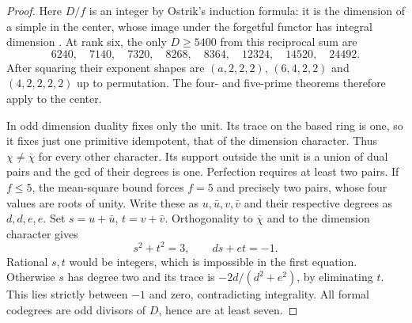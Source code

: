 \documentclass[11pt,a4paper]{article}
\numberwithin{equation}{section}
\theoremstyle{remark}
\begin{document}
\begin{proof}
Here $D/f$ is an integer by Ostrik's induction formula: it is the dimension of a simple in the center, whose image under the forgetful functor has integral dimension \cite[Theorem~2.13]{OstrikPivotalRankThree}. At rank six, the only $D\ge5400$ from this reciprocal sum are
\[
6240,\quad7140,\quad7320,\quad8268,\quad8364,\quad12324,\quad14520,\quad24492 .
\]
After squaring their exponent shapes are $(a,2,2,2)$, $(6,4,2,2)$
and $(4,2,2,2,2)$ up to permutation. The four- and five-prime theorems
therefore apply to the center.

In odd dimension duality fixes only the unit. Its trace on the based
ring is one, so it fixes just one primitive idempotent, that of the
dimension character. Thus $\chi\ne\overline\chi$ for every other
character. Its support outside the unit is a union of dual pairs and
the gcd of their degrees is one. Perfection requires at least two pairs.
If $f\le5$, the mean-square bound forces $f=5$ and precisely two pairs,
whose four values are roots of unity. Write these as $u,\bar u,v,\bar v$
and their respective degrees as $d,d,e,e$. Set $s=u+\bar u$,
$t=v+\bar v$. Orthogonality to $\overline\chi$ and to the dimension
character gives
\[
                  s^2+t^2=3 ,\qquad ds+et=-1 .
\]
Rational $s,t$ would be integers, which is impossible in the first
equation. Otherwise $s$ has degree two and its trace is
$-2d/(d^2+e^2)$, by eliminating $t$. This lies strictly between
$-1$ and zero, contradicting integrality. All formal codegrees
are odd divisors of $D$, hence are at least seven.


\end{proof}
\end{document}
